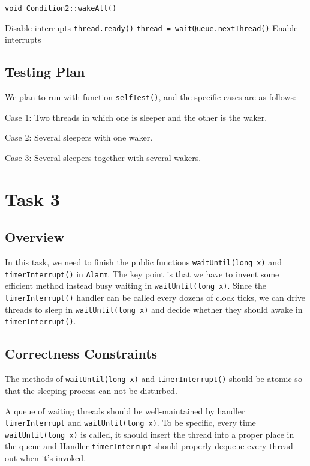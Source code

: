 \documentclass{article}
\begin{document}
\begin{spacing}{1.1}
    \begin{algorithm}
      \caption{ \texttt{void Condition2::wakeAll()}}
      \begin{algorithmic}
	\STATE Disable interrupts
	\STATE \texttt{thread.ready()}
	\STATE \texttt{thread = waitQueue.nextThread()}
	\ENDWHILE
	\STATE Enable interrupts
      \end{algorithmic}
    \end{algorithm}

    \subsection{Testing Plan}
    We plan to run with function \texttt{selfTest()}, and the specific cases are as follows:
    \begin{asparaitem}
    \item Case 1: Two threads in which one is sleeper and the other is the waker.
    \item Case 2: Several sleepers with one waker.
    \item Case 3: Several sleepers together with several wakers.
    \end{asparaitem}
    \section{Task 3}
    \subsection{Overview}
    In this task, we need to finish the public functions \texttt{waitUntil(long x)} and \texttt{timerInterrupt()} in \texttt{Alarm}. The key point is that we have to invent some efficient method instead busy waiting in \texttt{waitUntil(long x)}. Since the \texttt{timerInterrupt()} handler can be called every dozens of clock ticks, we can drive threads to sleep in \texttt{waitUntil(long x)} and decide whether they should awake in \texttt{timerInterrupt()}.
    \subsection{Correctness Constraints}
    \begin{asparaitem}
    \item The methods of \texttt{waitUntil(long x)} and \texttt{timerInterrupt()} should be atomic so that the sleeping process can not be disturbed.
    \item A queue of waiting threads should be well-maintained by handler \texttt{timerInterrupt} and \texttt{waitUntil(long x)}. To be specific, every time \texttt{waitUntil(long x)} is called, it should insert the thread into a proper place in the queue and Handler \texttt{timerInterrupt} should properly dequeue every thread out when it's invoked.
    \end{asparaitem}

\end{spacing}
\end{document}
